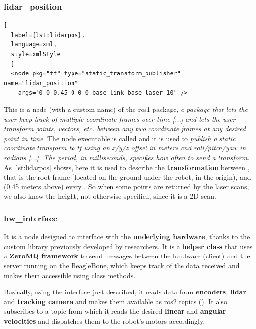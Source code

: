 \subsubsection{lidar\_position} %

\begin{lstlisting}[
  label={lst:lidarpos},
  language=xml,
  style=xmlStyle
  ]
  <node pkg="tf" type="static_transform_publisher" name="lidar_position"
    args="0 0 0.45 0 0 0 base_link base_laser 10" />
\end{lstlisting}

This is a node (with a custom name) of the \acrshort{ros}1  package, \textit{a package that lets the user keep track of multiple coordinate frames over time [...] and lets the user transform points, vectors, etc. between any two coordinate frames at any desired point in time}.\cite{tf} The node executable is called  and it is used to \textit{publish a static coordinate transform to tf using an x/y/z offset in meters and roll/pitch/yaw in radians [...]. The period, in milliseconds, specifies how often to send a transform}. \cite{tf} 
As \autoref{lst:lidarpos} shows, here it is used to describe the \textbf{transformation} between , that is the root frame (located on the ground under the robot, in the origin), and  (0.45 meters above) every . So when some points are returned by the laser scans, we also know the height, not otherwise specified, since it is a 2D scan.

\subsubsection{hw\_interface}

It is a node designed to interface with the \textbf{underlying hardware}, thanks to the custom  library previously developed by researchers. It is a \textbf{helper class} that uses a \textbf{ZeroMQ framework} to send messages between the hardware (client) and the server running on the BeagleBone, which keeps track of the data received and makes them accessible using class methods.

Basically, using the interface just described, it reads data from \textbf{encoders}, \textbf{lidar} and \textbf{tracking camera} and makes them available as \acrshort{ros}2 topics (). It also subscribes to a  topic from which it reads the desired \textbf{linear} and \textbf{angular velocities} and dispatches them to the robot's motors accordingly.

